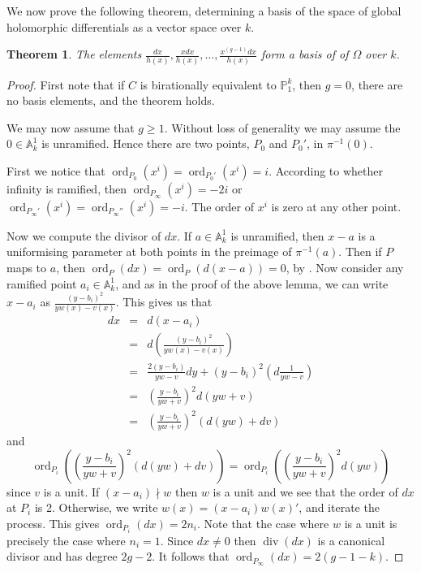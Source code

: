 \documentclass[11pt]{article} %
\newtheorem{thm}{Theorem}
\theoremstyle{remark}\newtheorem*{rem}{Remark}
\DeclareMathOperator{\ord}{ord}
\DeclareMathOperator{\di}{div}
\begin{document}
We now prove the following theorem, determining a basis of the space of global holomorphic differentials as a vector space over $k$.\\


\begin{thm}
 The elements $\frac{dx}{h(x)}, \frac{xdx}{h(x)}, \ldots , \frac{x^{(g-1)}dx}{h(x)}$ form a basis of  of $\Omega$ over $k$.
\end{thm}
\begin{proof}

First note that if $C$ is birationally equivalent to $\mathbb P_1^k$, then $g=0$, there are no basis elements, and the theorem holds.

We may now assume that $g\geq 1$.
Without loss of generality we may assume the $0\in \mathbb A_k^1$ is unramified.
Hence there are two points, $P_0$ and $P_0'$, in $\pi^{-1}(0)$.


First we notice that $\ord_{P_0}(x^i)=\ord_{P_0'}(x^i)=i$.
According to whether infinity is ramified, then $\ord_{P_{\infty}}(x^i)=-2i$ or $\ord_{P_{\infty}'}(x^i)=\ord_{P_{\infty}''}(x^i)=-i$.
The order of $x^i$ is zero at any other point.


Now we compute the divisor of $dx$. 
If $a\in \mathbb A_k^1$ is unramified, then $x-a$ is a uniformising parameter at both points in the preimage of $\pi^{-1}(a)$.
Then if $P$ maps to $a$, then $\ord_P(dx)=\ord_P(d(x-a))=0$, by \cite[\S 8.5]{fulton}.
Now consider any ramified point $a_i\in \mathbb A_k^1$, and as in the proof of the above lemma, we can write $x-a_i$ as $\frac{(y-b_i)^2}{yw(x)-v(x)}$.
This gives us that
\begin{eqnarray*}
 dx & = & d(x-a_i) \\
 & = & d \left( \frac{(y-b_i)^2}{yw(x)-v(x)} \right) \\
 & = & \frac{2(y-b_i)}{yw-v} dy + (y-b_i)^2\left( d\frac{1}{yw-v}\right)\\
 & = & \left( \frac{y-b_i}{yw+v}\right)^2d(yw+v)\\
 & = & \left( \frac{y-b_i}{yw+v}\right)^2(d(yw)+dv)
 \end{eqnarray*}
 and 
 \[
\ord_{P_i}\left( \left( \frac{y-b_i}{yw+v}\right)^2(d(yw)+dv)\right) = \ord_{P_i}\left( \left( \frac{y-b_i}{yw+v}\right)^2d(yw)\right)
\]
since $v$ is a unit.
If $(x-a_i)\nmid w$ then $w$ is a unit and we see that the order of $dx$ at $P_i$ is 2.
Otherwise, we write $w(x)=(x-a_i)w(x)'$, and iterate the process.
This gives $\ord_{P_i}(dx)=2n_i$.
Note that the case where $w$ is a unit is precisely the case where $n_i=1$.
Since $dx\neq 0$ then $\di (dx)$ is a canonical divisor and has degree $2g-2$.
It follows that $\ord_{P_{\infty}}(dx)=2(g-1-k)$.


\end{proof}
\end{document}
